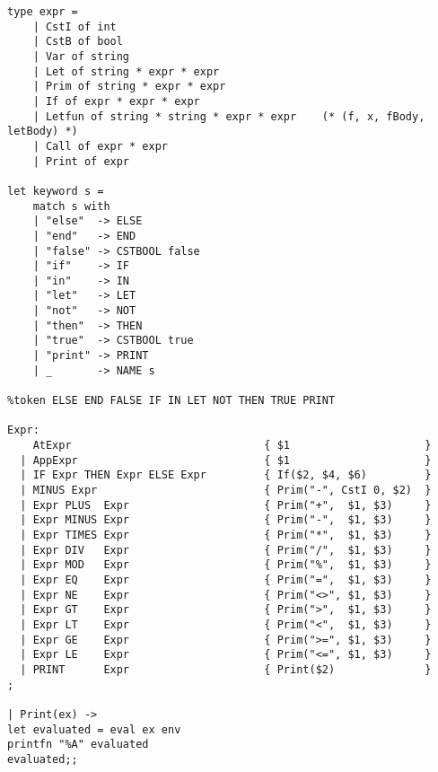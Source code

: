 \begin{verbatim}
type expr = 
    | CstI of int
    | CstB of bool
    | Var of string
    | Let of string * expr * expr
    | Prim of string * expr * expr
    | If of expr * expr * expr
    | Letfun of string * string * expr * expr    (* (f, x, fBody, letBody) *)
    | Call of expr * expr
    | Print of expr

let keyword s =
    match s with
    | "else"  -> ELSE 
    | "end"   -> END
    | "false" -> CSTBOOL false
    | "if"    -> IF
    | "in"    -> IN
    | "let"   -> LET
    | "not"   -> NOT
    | "then"  -> THEN
    | "true"  -> CSTBOOL true
    | "print" -> PRINT
    | _       -> NAME s

%token ELSE END FALSE IF IN LET NOT THEN TRUE PRINT

Expr:
    AtExpr                              { $1                     }
  | AppExpr                             { $1                     }
  | IF Expr THEN Expr ELSE Expr         { If($2, $4, $6)         }
  | MINUS Expr                          { Prim("-", CstI 0, $2)  }
  | Expr PLUS  Expr                     { Prim("+",  $1, $3)     }
  | Expr MINUS Expr                     { Prim("-",  $1, $3)     }
  | Expr TIMES Expr                     { Prim("*",  $1, $3)     }
  | Expr DIV   Expr                     { Prim("/",  $1, $3)     } 
  | Expr MOD   Expr                     { Prim("%",  $1, $3)     }
  | Expr EQ    Expr                     { Prim("=",  $1, $3)     }
  | Expr NE    Expr                     { Prim("<>", $1, $3)     }
  | Expr GT    Expr                     { Prim(">",  $1, $3)     }
  | Expr LT    Expr                     { Prim("<",  $1, $3)     }
  | Expr GE    Expr                     { Prim(">=", $1, $3)     }
  | Expr LE    Expr                     { Prim("<=", $1, $3)     }
  | PRINT      Expr                     { Print($2)              }
;

| Print(ex) -> 
let evaluated = eval ex env
printfn "%A" evaluated
evaluated;;
\end{verbatim}